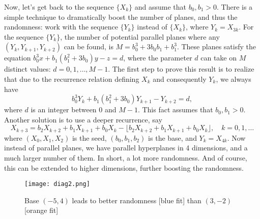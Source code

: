 \documentclass[oneside,10pt]{book}
\begin{document}
Now, let's get back to the sequence $\{X_k\}$ and assume that $b_0, b_1>0$. There is a simple technique to dramatically boost the number of planes, and thus the randomness: work with the sequence $\{Y_k\}$ instead of $\{X_k\}$, where
 $Y_k = X_{3k}$. For the sequence $\{Y_{k}\}$, the number of potential parallel planes where any $(Y_k,Y_{k+1},Y_{k+2})$ can be found, is $M = b_0^3 + 3b_0 b_1 + b_1^3$. These planes satisfy the equation
 $b_0^3 x +b_1(b_1^2 +3b_0) y - z =d$, where the parameter $d$ can take on $M$ distinct values: $d = 0, 1,\dots,M-1$.  The first step to prove this result is to realize that due to the recurrence relation defining $X_k$ and consequently $Y_k$, we always have
$$
b_0^3 Y_k +b_1(b_1^2 +3b_0) Y_{k+1} - Y_{k+2} =d,
$$
where $d$ is an integer between $0$ and $M-1$. This fact assumes that $b_0, b_1 > 0$. Another solution is to use a deeper recurrence,
 say
$$
X_{k+3} = b_2 X_{k+2} + b_1 X_{k+1} + b_0 X_k - \lfloor b_2 X_{k+2} + b_1 X_{k+1} + b_0 X_k \rfloor, \quad k=0,1,\dots
$$
 where $(X_0, X_1, X_2)$ is the seed, $(b_0, b_1, b_2)$ is the base, and $Y_k=X_{4k}$. Now instead of parallel planes, we have
 parallel hyperplanes in 4 dimensions, and a much larger number of them. In short, a lot more randomness. And of course, this can be extended to higher dimensions, further boosting the randomness.

\begin{figure}%
\centering
\texttt{[image: diag2.png]}
\caption{Base $(-5,4)$ leads to better randomness [blue fit] than $(3,-2)$ [orange fit]}
\label{fig:diag}
\end{figure}
\end{document}
